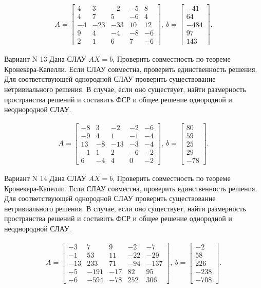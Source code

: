 \documentclass[11pt]{report}
\begin{document}
\begin{align*}
 A = \left[\begin{matrix}4 & 3 & -2 & -5 & 8\\4 & 7 & 5 & -6 & 4\\-4 & -23 & -33 & 10 & 12\\9 & 4 & -4 & -8 & -6\\2 & 1 & 6 & 7 & -6\end{matrix}\right],
\ b = \left[\begin{matrix}-41\\64\\-484\\97\\143\end{matrix}\right]. 
 \end{align*}

Вариант N 13
Дана СЛАУ $AX = b$,
Проверить совместность по теореме Кронекера-Капелли. Если СЛАУ совместна, проверить единственность решения.
Для соответствующей однородной СЛАУ проверить существование нетривиального решения. В случае, если оно существует,
найти размерность пространства решений и составить ФСР и общее решение однородной  и неоднородной СЛАУ.


\begin{align*}
 A = \left[\begin{matrix}-8 & 3 & -2 & -2 & -6\\-9 & 4 & 1 & -1 & -4\\13 & -8 & -13 & -3 & -4\\-1 & 1 & 2 & -6 & -2\\6 & -4 & 4 & 0 & -2\end{matrix}\right],
\ b = \left[\begin{matrix}80\\59\\25\\29\\-78\end{matrix}\right]. 
 \end{align*}

Вариант N 14
Дана СЛАУ $AX = b$,
Проверить совместность по теореме Кронекера-Капелли. Если СЛАУ совместна, проверить единственность решения.
Для соответствующей однородной СЛАУ проверить существование нетривиального решения. В случае, если оно существует,
найти размерность пространства решений и составить ФСР и общее решение однородной  и неоднородной СЛАУ.


\begin{align*}
 A = \left[\begin{matrix}-3 & 7 & 9 & -2 & -7\\-1 & 53 & 11 & -22 & -29\\-13 & 233 & 71 & -94 & -137\\-5 & -191 & -17 & 82 & 95\\-6 & -594 & -78 & 252 & 306\end{matrix}\right],
\ b = \left[\begin{matrix}-2\\58\\226\\-238\\-708\end{matrix}\right]. 
 \end{align*}
\end{document}
